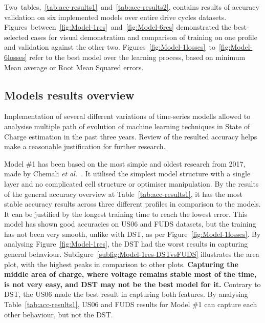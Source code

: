 %
%
\mbox{Two tables, \ref{tab:acc-results1} and \ref{tab:acc-results2}}, contains results of accuracy validation on six implemented models over entire drive cycles datasets.
\mbox{Figures between \ref{fig:Model-1res} and \ref{fig:Model-6res}} demonstrated the best-selected cases for visual demonstration and comparison of training on one profile and validation against the other two.
\mbox{Figures \ref{fig:Model-1losses} to \ref{fig:Model-6losses}} refer to the best model over the learning process, based on minimum Mean average or Root Mean Squared errors.

%
%
\subsection{Models results overview}
Implementation of several different variations of time-series modells allowed to analysise multiple path of evolution of machine learning techniques in State of Charge estimation in the past three years.
Review of the resulted accuracy helps make a reasonable justification for further research.

%
%
Model \#1 has been based on the most simple and oldest research from 2017, made by Chemali \textit{et al.}~\cite{Chemali2017}.
It utilised the simplest model structure with a single layer and no complicated cell structure or optimiser manipulation.
By the results of the general accuracy overview at Table~\ref{tab:acc-results1}, it has the most stable accuracy results across three different profiles in comparison to the models.
It can be justified by the longest training time to reach the lowest error.
This model has shown good accuracies on US06 and FUDS datasets, but the training has not been very smooth, unlike with DST, as per Figure~\ref{fig:Model-1losses}.
By analysing Figure~\ref{fig:Model-1res}, the DST had the worst results in capturing general behaviour. Subfigure~\ref{subfig:Model-1res-DSTvsFUDS} illustrates the area plot, with the highest peaks in comparison to other plots.
\textbf{Capturing the middle area of charge, where voltage remains stable most of the time, is not very easy, and DST may not be the best model for it.}
Contrary to DST, the US06 made the best result in capturing both features.
By analysing Table~\ref{tab:acc-results1}, US06 and FUDS results for Model \#1 can capture each other behaviour, but not the DST.

